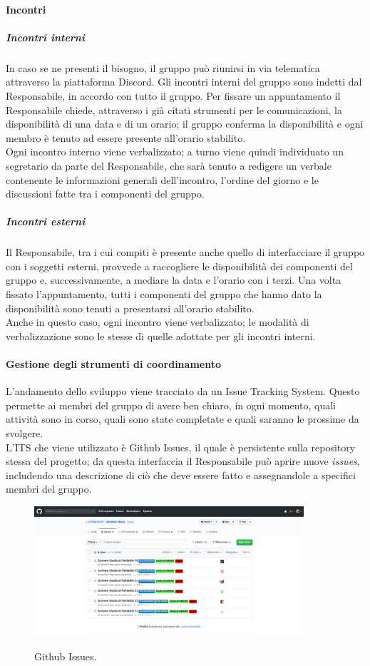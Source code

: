 \documentclass[../norme-di-progetto.tex]{subfiles}
\begin{document}
\paragraph{Incontri}
\subparagraph{Incontri interni}
In caso se ne presenti il bisogno, il gruppo può riunirsi in via telematica attraverso la piattaforma Discord. Gli incontri interni del gruppo sono indetti dal Responsabile, in accordo con tutto il gruppo. Per fissare un appuntamento il Responsabile chiede, attraverso i già citati strumenti per le comunicazioni, la disponibilità di una data e di un orario; il gruppo conferma la disponibilità e ogni membro è tenuto ad essere presente all'orario stabilito. \\
Ogni incontro interno viene verbalizzato; a turno viene quindi individuato un segretario da parte del Responsabile, che sarà tenuto a redigere un verbale contenente le informazioni generali dell'incontro, l'ordine del giorno e le discussioni fatte tra i componenti del gruppo.

\subparagraph{Incontri esterni}
Il Responsabile, tra i cui compiti è presente anche quello di interfacciare il gruppo con i soggetti esterni, provvede a raccogliere le disponibilità dei componenti del gruppo e, successivamente, a mediare la data e l'orario con i terzi. Una volta fissato l'appuntamento, tutti i componenti del gruppo che hanno dato la disponibilità sono tenuti a presentarsi all'orario stabilito. \\
Anche in questo caso, ogni incontro viene verbalizzato; le modalità di verbalizzazione sono le stesse di quelle adottate per gli incontri interni.

\paragraph{Gestione degli strumenti di coordinamento}
L'andamento dello sviluppo viene tracciato da un Issue Tracking System. Questo permette ai membri del gruppo di avere ben chiaro, in ogni momento, quali attività sono in corso, quali sono state completate e quali saranno le prossime da svolgere. \\ L'ITS che viene utilizzato è Github Issues, il quale è persistente sulla repository stessa del progetto; da questa interfaccia il Responsabile può aprire nuove \textit{issues}, includendo una descrizione di ciò che deve essere fatto e assegnandole a specifici membri del gruppo.

\begin{figure}[H]
  \centering
  \includegraphics[width=10cm]{img/issues.png}
  \label{fig:sheets}
  \caption{Github Issues.}
\end{figure}
\end{document}

